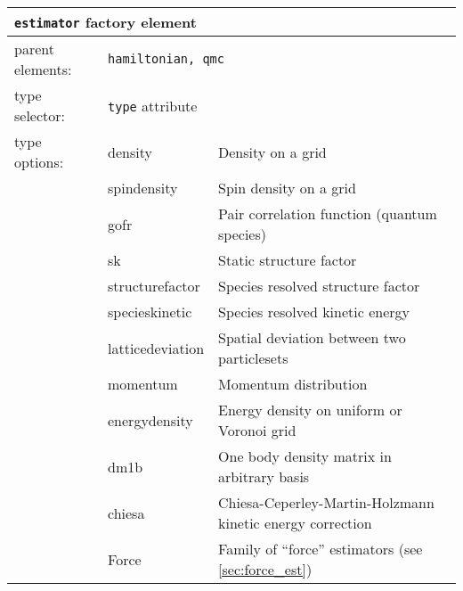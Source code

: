 \FloatBarrier
\begin{table}[h]
\begin{center}
\begin{tabularx}{\textwidth}{l l l l l l }
\hline
\multicolumn{6}{l}{\texttt{estimator} factory element} \\
\hline
\multicolumn{2}{l}{parent elements:} & \multicolumn{4}{l}{\texttt{hamiltonian, qmc}}\\
\multicolumn{2}{l}{type   selector:} & \multicolumn{4}{l}{\texttt{type} attribute}\\
\multicolumn{2}{l}{type   options: } & \multicolumn{2}{l}{density           } & \multicolumn{2}{l}{Density on a grid}\\
\multicolumn{2}{l}{                } & \multicolumn{2}{l}{spindensity       } & \multicolumn{2}{l}{Spin density on a grid}\\
\multicolumn{2}{l}{                } & \multicolumn{2}{l}{gofr              } & \multicolumn{2}{l}{Pair correlation function (quantum species)}\\
\multicolumn{2}{l}{                } & \multicolumn{2}{l}{sk                } & \multicolumn{2}{l}{Static structure factor}\\
\multicolumn{2}{l}{                } & \multicolumn{2}{l}{structurefactor   } & \multicolumn{2}{l}{Species resolved structure factor}\\
\multicolumn{2}{l}{                } & \multicolumn{2}{l}{specieskinetic    } & \multicolumn{2}{l}{Species resolved kinetic energy}\\
\multicolumn{2}{l}{                } & \multicolumn{2}{l}{latticedeviation  } & \multicolumn{2}{l}{Spatial deviation between two particlesets}\\
\multicolumn{2}{l}{                } & \multicolumn{2}{l}{momentum          } & \multicolumn{2}{l}{Momentum distribution}\\
\multicolumn{2}{l}{                } & \multicolumn{2}{l}{energydensity     } & \multicolumn{2}{l}{Energy density on uniform or Voronoi grid}\\
\multicolumn{2}{l}{                } & \multicolumn{2}{l}{dm1b              } & \multicolumn{2}{l}{One body density matrix in arbitrary basis}\\
\multicolumn{2}{l}{                } & \multicolumn{2}{l}{chiesa            } & \multicolumn{2}{l}{Chiesa-Ceperley-Martin-Holzmann kinetic energy correction}\\
\multicolumn{2}{l}{                } & \multicolumn{2}{l}{Force             } & \multicolumn{2}{l}{Family of ``force'' estimators (see \ref{sec:force_est})}\\

\end{tabularx}
\end{center}
\end{table}
